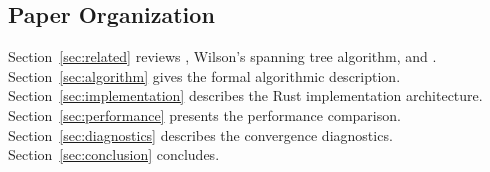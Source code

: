 \subsection{Paper Organization}

Section~\ref{sec:related} reviews \recom{}, Wilson's spanning tree
algorithm, and \gc{}.
Section~\ref{sec:algorithm} gives the formal algorithmic description.
Section~\ref{sec:implementation} describes the Rust implementation
architecture.
Section~\ref{sec:performance} presents the performance comparison.
Section~\ref{sec:diagnostics} describes the convergence diagnostics.
Section~\ref{sec:conclusion} concludes.
